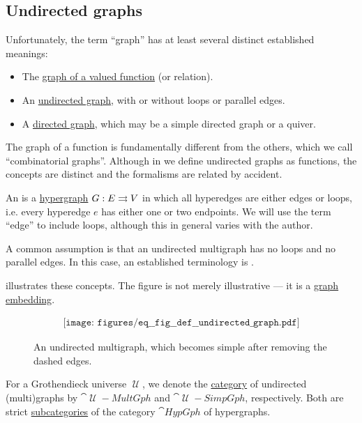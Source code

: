 \subsection{Undirected graphs}\label{subsec:undirected_graphs}

\begin{remark}\label{rem:graph_etymology}
  Unfortunately, the term \enquote{graph} has at least several distinct established meanings:
  \begin{itemize}
    \item The \hyperref[def:multi_valued_function/graph]{graph of a valued function} (or relation).
    \item An \hyperref[def:undirected_graph]{undirected graph}, with or without loops or parallel edges.
    \item A \hyperref[def:quiver]{directed graph}, which may be a simple directed graph or a quiver.
  \end{itemize}

  The graph of a function is fundamentally different from the others, which we call \enquote{combinatorial graphs}. Although in  we define undirected graphs as functions, the concepts are distinct and the formalisms are related by accident.
\end{remark}

\begin{definition}\label{def:undirected_graph}
  An  is a \hyperref[def:hypergraph]{hypergraph} \( G: E \rightrightarrows V \) in which all hyperedges are either edges or loops, i.e. every hyperedge \( e \) has either one or two endpoints. We will use the term \enquote{edge} to include loops, although this in general varies with the author.

  A common assumption is that an undirected multigraph has no loops and no parallel edges. In this case, an established terminology is .

   illustrates these concepts. The figure is not merely illustrative --- it is a \hyperref[def:graph_geometric_realization/embedding]{graph embedding}.

  \begin{figure}[h]
    \begin{equation}\label{eq:fig:def:undirected_graph}
      \begin{aligned}
        \texttt{[image: figures/eq\_\_fig\_\_def\_\_undirected\_graph.pdf]}
      \end{aligned}
    \end{equation}
    \caption{An undirected multigraph, which becomes simple after removing the dashed edges.}\label{fig:def:undirected_graph}
  \end{figure}

  For a Grothendieck universe \( \mscrU \), we denote the \hyperref[def:category]{category} of undirected (multi)graphs by \( \cat{\mscrU-MultGph} \) and \( \cat{\mscrU-SimpGph} \), respectively. Both are strict \hyperref[def:subcategory]{subcategories} of the category \hyperref[def:category_of_small_hypergraphs]{\( \cat{HypGph} \)} of hypergraphs.
\end{definition}

